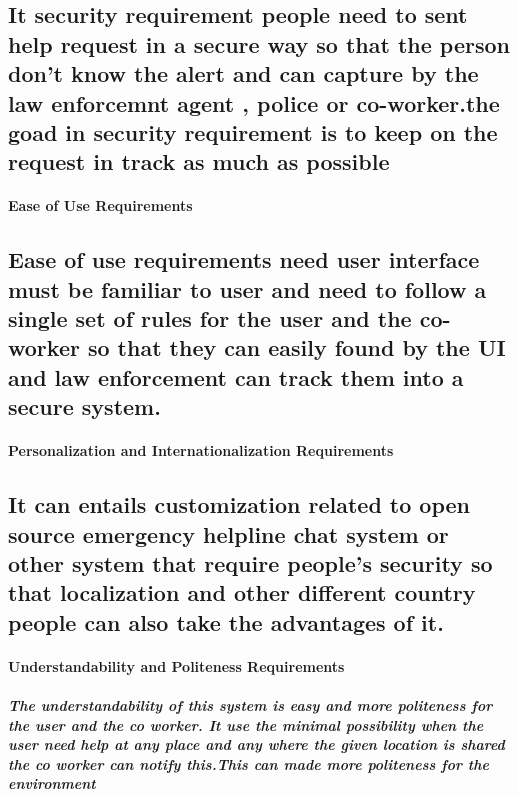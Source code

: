 \documentclass{article}
\begin{document}
\subsection{It security requirement people need to sent help request in a secure way so that the person don't know the alert and can capture by the law enforcemnt agent , police or co-worker.the goad in security requirement is to keep on the request in track as much as possible}




\paragraph{Ease of Use Requirements}
\subsection{Ease of use requirements need user interface must be familiar to user and need  to follow a single set of rules for the user and the co-worker 
so that they can easily  found by the UI and law enforcement can track them into a secure system.}


\paragraph{Personalization and Internationalization Requirements}
\subsection{It can entails customization related to open source emergency helpline chat system or other system that require people's security so that localization and other different country people can also take the advantages of it.}

\paragraph{Understandability and Politeness Requirements}
\subparagraph{The understandability of this system is easy and more politeness for the user and the co worker. It use  the minimal possibility when the user need help at any place and any where the given location is shared the co worker can notify this.This can made more politeness for the environment}
\end{document}
